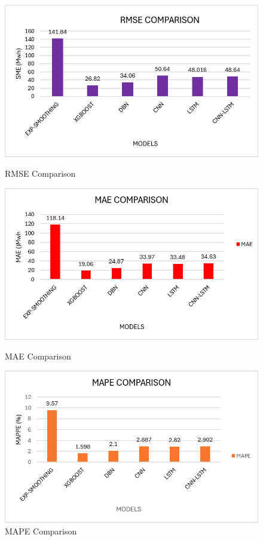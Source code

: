  \begin{figure}[h]
 	\centering
 	\begin{minipage}[b]{0.325\linewidth}
 		\includegraphics[width=\linewidth]{Chapters/images/results/RMSE_COMPARISON}
 		\caption{RMSE Comparison}
 		\label{fig:rmsecomparison}
 	\end{minipage}
 	\begin{minipage}[b]{0.325\linewidth}
 		\includegraphics[width=\linewidth]{Chapters/images/results/MAE_COMPARISON}
 		\caption{MAE Comparison}
 		\label{fig:maecomparison}
 	\end{minipage}
 	\begin{minipage}[b]{0.325\linewidth}
 		\includegraphics[width=\linewidth]{Chapters/images/results/MAPE_COMPARISON1}
 		\caption{MAPE Comparison}
 		\label{fig:mapecomparison1}
 	\end{minipage}
 \end{figure}
 
